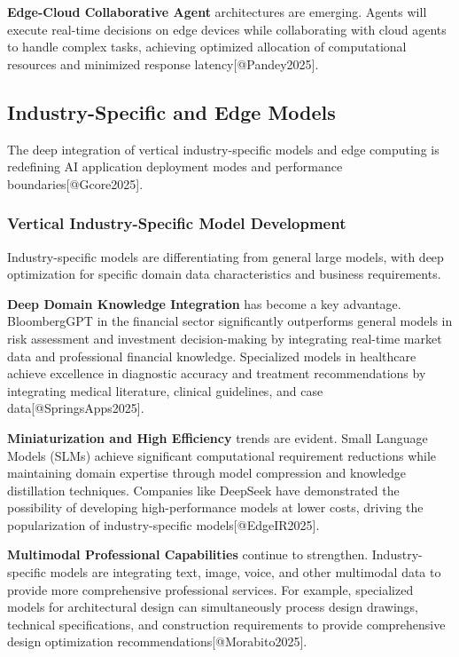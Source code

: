 \documentclass{article}
\begin{document}
\textbf{Edge-Cloud Collaborative Agent} architectures are emerging. Agents will execute real-time decisions on edge devices while collaborating with cloud agents to handle complex tasks, achieving optimized allocation of computational resources and minimized response latency[@Pandey2025].

\subsection{Industry-Specific and Edge Models}
The deep integration of vertical industry-specific models and edge computing is redefining AI application deployment modes and performance boundaries[@Gcore2025].

\subsubsection{Vertical Industry-Specific Model Development}
Industry-specific models are differentiating from general large models, with deep optimization for specific domain data characteristics and business requirements.

\textbf{Deep Domain Knowledge Integration} has become a key advantage. BloombergGPT in the financial sector significantly outperforms general models in risk assessment and investment decision-making by integrating real-time market data and professional financial knowledge. Specialized models in healthcare achieve excellence in diagnostic accuracy and treatment recommendations by integrating medical literature, clinical guidelines, and case data[@SpringsApps2025].

\textbf{Miniaturization and High Efficiency} trends are evident. Small Language Models (SLMs) achieve significant computational requirement reductions while maintaining domain expertise through model compression and knowledge distillation techniques. Companies like DeepSeek have demonstrated the possibility of developing high-performance models at lower costs, driving the popularization of industry-specific models[@EdgeIR2025].

\textbf{Multimodal Professional Capabilities} continue to strengthen. Industry-specific models are integrating text, image, voice, and other multimodal data to provide more comprehensive professional services. For example, specialized models for architectural design can simultaneously process design drawings, technical specifications, and construction requirements to provide comprehensive design optimization recommendations[@Morabito2025].
\end{document}
